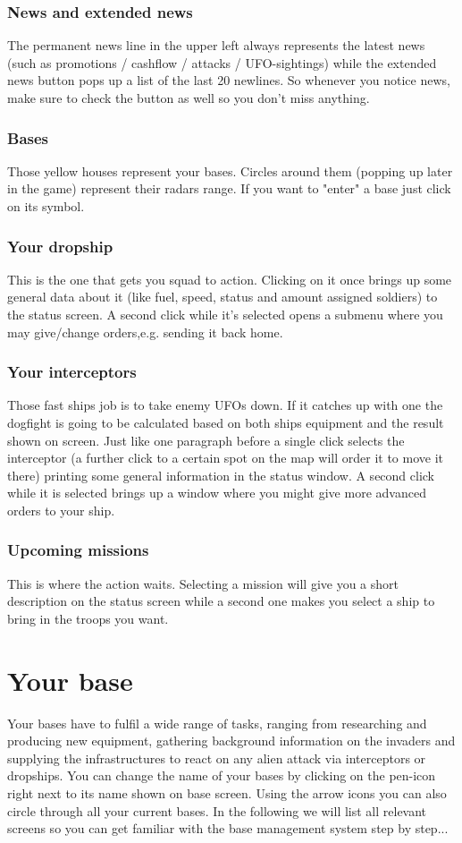 \subsubsection{News and extended news}
The permanent news line in the upper left always represents the latest news (such as promotions / cashflow / attacks / UFO-sightings) while the extended news button pops up a list of the last 20 newlines.
So whenever you notice news, make sure to check the button as well so you don't miss anything. 
\subsubsection{Bases}
Those yellow houses represent your bases. Circles around them (popping up later in the game) represent their radars range.  If you want to "enter" a base just click on its symbol.
\subsubsection{Your dropship}
This is the one that gets you squad to action. Clicking on it once brings up some general data about it (like fuel, speed, status and amount assigned soldiers) to the status screen. A second click while it's selected opens a submenu where you may give/change orders,e.g. sending it back home.
\subsubsection{Your interceptors}
Those fast ships job is to take enemy UFOs down. If it catches up with one the dogfight is going to be calculated based on both ships equipment and the result shown on screen. Just like one paragraph before a single click selects the interceptor (a further click to a certain spot on the map will order it to move it there) printing some general information in the status window. A second click while it is selected brings up a window where you might give more advanced orders to your ship.
\subsubsection{Upcoming missions}
This is where the action waits. Selecting a mission will give you a short description on the status screen while a second one makes you select a ship to bring in the troops you want.


\section{Your base}
Your bases have to fulfil a wide range of tasks, ranging from researching and producing new equipment, gathering background information on the invaders and supplying the infrastructures to react on any alien attack via interceptors or dropships. You can change the name of your bases by clicking on the pen-icon right next to its name shown on base screen. Using the arrow icons you can also circle through all your current bases. In the following we will list all relevant screens so you can get familiar with the base management system step by step...

